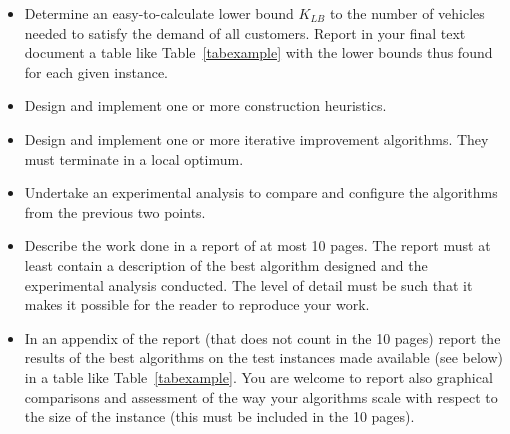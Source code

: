 \begin{itemize}

\item Determine an easy-to-calculate lower bound $K_{LB}$ to the number
  of vehicles needed to satisfy the demand of all customers.  Report in
  your final text document a table like Table~\ref{tabexample}
  with the lower bounds thus found for each given instance.




\item Design and implement one or more construction heuristics.

\item Design and implement one or more iterative improvement
  algorithms. They must terminate in a local optimum.

\item Undertake an experimental analysis to compare and
  configure the algorithms from the previous two points. 

\item Describe the work done in a report of at most 10 pages. The report
  must at least contain a description of the best algorithm designed and
  the experimental analysis conducted. The level of detail must be such
  that it makes it possible for the reader to reproduce your work.



\item In an appendix of the report (that does not count in the 10 pages)
  report the results of the best algorithms on the test instances
  made available (see below) in a table like Table~\ref{tabexample}. You
  are welcome to report also graphical comparisons and assessment of the
  way your algorithms scale with respect to the size of the instance
  (this must be included in the 10 pages).  





\end{itemize}
